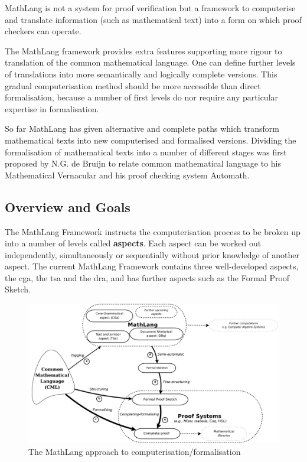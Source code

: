 MathLang is not a system for proof verification but a framework to computerise
and translate information (such as mathematical text) into a form on which proof
checkers can operate.

The MathLang framework provides extra features supporting more rigour to
translation of the common mathematical language. One can define further levels
of translations into more semantically and logically complete versions. This
gradual computerisation method should be more accessible than direct
formalisation, because a number of first levels do nor require any particular
expertise in formalisation.

So far MathLang has given alternative and complete paths which transform
mathematical texts into new computerised and formalised versions. Dividing the
formalisation of mathematical texts into a number of different stages was first
proposed by N.G. de Bruijn to relate common mathematical language to his
Mathematical Vernacular \cite{mv} and his proof checking system Automath.

\subsection{Overview and Goals}

The MathLang Framework instructs the computerisation process to be broken up
into a number of levels called \textbf{aspects}. Each aspect can be worked out
independently, simultaneously or sequentially without prior knowledge of another
aspect. The current MathLang Framework contains three well-developed aspects,
the \gls{cga}, the \gls{tsa} and the \gls{dra}, and has further aspects such as
the Formal Proof Sketch.

\begin{figure}[H]
\begin{center}
\includegraphics[scale=0.255]{Figures/Background/mathlang.png}
\end{center}
\caption{The MathLang approach to computerisation/formalisation \cite{mathintomizar}\label{fig:mathlang}}
\end{figure}


